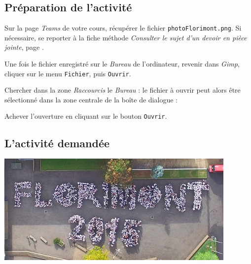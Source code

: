 \subsection{Préparation de l'activité}

Sur la page \emph{Teams} de votre cours, récupérer le fichier \texttt{photoFlorimont.png}. Si nécessaire, se reporter à la fiche méthode \emph{Consulter le sujet d'un devoir en pièce jointe}, page \pageref{consulterDevoir}.

Une fois le fichier enregistré sur le \emph{Bureau} de l'ordinateur, revenir dans \emph{Gimp}, cliquer sur le menu \texttt{Fichier}, puis \texttt{Ouvrir}.


Chercher dans la zone \emph{Raccourcis} le \emph{Bureau} : le fichier à ouvrir peut alors être sélectionné dans la zone centrale de la boîte de dialogue :


Achever l'ouverture en cliquant sur le bouton \texttt{Ouvrir}.



\subsection{L'activité demandée}



\begin{center}\includegraphics[width=.7\textwidth]{./images/gimp/photoFlorimontReduite}\label{modeleImage}\end{center}

